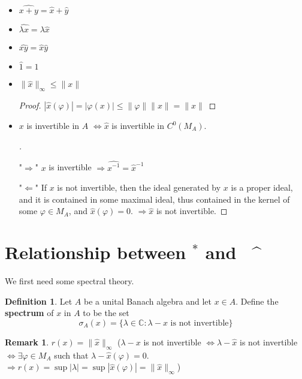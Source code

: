 \documentclass{article}
\theoremstyle{definition}
\newtheorem{dfn}{Definition}
\newtheorem{rem}{Remark}
\newenvironment{proofs}[1][\proofname]{%
  \begin{proof}[#1]$ $\par\nobreak\ignorespaces
}{%
  \end{proof}
}
\newcommand{\CC}{\mathbb C}
\newcommand{\Ra}{\Rightarrow}
\newcommand{\La}{\Leftarrow}
\newcommand{\Lra}{\Leftrightarrow}
\begin{document}
\begin{itemize}
	\item $\widehat{x + y} = \widehat{x} + \widehat{y}$

	\item $\widehat{\lambda x} = \lambda \widehat{x}$

	\item $\widehat{xy} = \widehat{x} \widehat{y}$

	\item $\widehat{1} = 1$

	\item $\|\widehat{x}\|_{\infty} \leq \|x\|$

		\begin{proof}
			$|\widehat{x}(\varphi)| = |\varphi(x)| \leq \|\varphi\| \|x\| = \|x\|$
		\end{proof}

	\item $x$ is invertible in $A$ $\Lra \widehat{x}$ is invertible in $C^0(M_A)$.

		\begin{proofs}
			"$\Ra$" $x$ is invertible $\Ra \widehat{x^{-1}} = \widehat{x}^{-1}$

			"$\La$" If $x$ is not invertible, then the ideal generated by $x$ is a proper ideal, and it is contained in some maximal ideal, thus contained in the kernel of some $\varphi \in M_A$, and $\widehat{x}(\varphi) = 0$.
			$\Ra \widehat{x}$ is not invertible.
		\end{proofs}
\end{itemize}

\section{Relationship between $^*$ and \, $\^$}
We first need some spectral theory.

\begin{dfn}
	Let $A$ be a unital Banach algebra and let $x \in A$.
	Define the \textbf{spectrum} of $x$ in $A$ to be the set 
	\[
		\sigma_A(x) = \{\lambda \in \CC: \lambda - x \text{ is not invertible}\}
	\]
\end{dfn}

\begin{rem}
	$r(x) = \|\widehat{x}\|_\infty$
	($\lambda - x$ is not invertible $\Lra \lambda - \widehat{x}$ is not invertible $\Lra \exists \varphi \in M_A$ such that $\lambda - \widehat{x}(\varphi) = 0$.
	$\Ra r(x) = \sup |\lambda| = \sup|\widehat{x}(\varphi)| = \|\widehat{x}\|_\infty$)
\end{rem}
\end{document}
